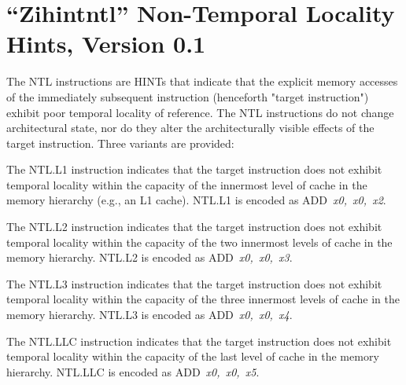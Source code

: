 \chapter{``Zihintntl'' Non-Temporal Locality Hints, Version 0.1}
\label{chap:zihintpause}

The NTL instructions are HINTs that indicate that the explicit memory accesses of the immediately subsequent
instruction (henceforth "target instruction") exhibit poor temporal locality of reference.
The NTL instructions do not change architectural state, nor do they alter the
architecturally visible effects of the target instruction.
Three variants are provided:

The NTL.L1 instruction indicates that the target instruction
does not exhibit temporal locality within the capacity of the innermost level
of cache in the memory hierarchy (e.g., an L1 cache).
NTL.L1 is encoded as \mbox{ADD {\em x0, x0, x2}}.

The NTL.L2 instruction indicates that the target instruction
does not exhibit temporal locality within the capacity of the two innermost
levels of cache in the memory hierarchy.
NTL.L2 is encoded as \mbox{ADD {\em x0, x0, x3}}.

The NTL.L3 instruction indicates that the target instruction
does not exhibit temporal locality within the capacity of the three innermost
levels of cache in the memory hierarchy.
NTL.L3 is encoded as \mbox{ADD {\em x0, x0, x4}}.

The NTL.LLC instruction indicates that the target
instruction does not exhibit temporal locality within the capacity of the last
level of cache in the memory hierarchy.
NTL.LLC is encoded as \mbox{ADD {\em x0, x0, x5}}.

